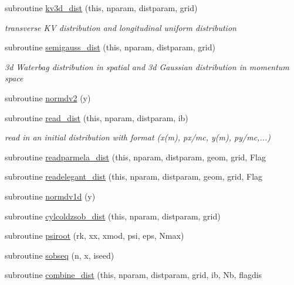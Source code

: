 \begin{DoxyCompactItemize}
subroutine \mbox{\hyperlink{namespacedistributionclass_a2e96d2c85cac39531d37f2ce057c5766}{kv3d\+\_\+dist}} (this, nparam, distparam, grid)
\begin{DoxyCompactList}\small\item\em transverse KV distribution and longitudinal uniform distribution \end{DoxyCompactList}\item 
subroutine \mbox{\hyperlink{namespacedistributionclass_a5ae8e13c52291510b7b0b6fe333db73f}{semigauss\+\_\+dist}} (this, nparam, distparam, grid)
\begin{DoxyCompactList}\small\item\em 3d Waterbag distribution in spatial and 3d Gaussian distribution in momentum space \end{DoxyCompactList}\item 
subroutine \mbox{\hyperlink{namespacedistributionclass_a020961b4717af242fc3c82090a17ce12}{normdv2}} (y)
\item 
subroutine \mbox{\hyperlink{namespacedistributionclass_adfcb2065e951ea9aa42c588f881e6021}{read\+\_\+dist}} (this, nparam, distparam, ib)
\begin{DoxyCompactList}\small\item\em read in an initial distribution with format (x(m), px/mc, y(m), py/mc,...) \end{DoxyCompactList}\item 
subroutine \mbox{\hyperlink{namespacedistributionclass_aed89b043090c1817fc57baaa9604eb73}{readparmela\+\_\+dist}} (this, nparam, distparam, geom, grid, Flag
\item 
subroutine \mbox{\hyperlink{namespacedistributionclass_acf080fd52aac8287d955bcfd88362c07}{readelegant\+\_\+dist}} (this, nparam, distparam, geom, grid, Flag
\item 
subroutine \mbox{\hyperlink{namespacedistributionclass_ac36fd92d83720ca88efee259d51ec474}{normdv1d}} (y)
\item 
subroutine \mbox{\hyperlink{namespacedistributionclass_a149c64b379e691ba9bfba3dc16c44571}{cylcoldzsob\+\_\+dist}} (this, nparam, distparam, grid)
\item 
subroutine \mbox{\hyperlink{namespacedistributionclass_a714922ece09780473330b901fa566f71}{psiroot}} (rk, xx, xmod, psi, eps, Nmax)
\item 
subroutine \mbox{\hyperlink{namespacedistributionclass_a8125c1fdf424cfd4bad6cd74eb2d3946}{sobseq}} (n, x, iseed)
\item 
subroutine \mbox{\hyperlink{namespacedistributionclass_ae01180ba4966edba5753229ef24e5b8b}{combine\+\_\+dist}} (this, nparam, distparam, grid, ib, Nb, flagdis

\end{DoxyCompactItemize}
